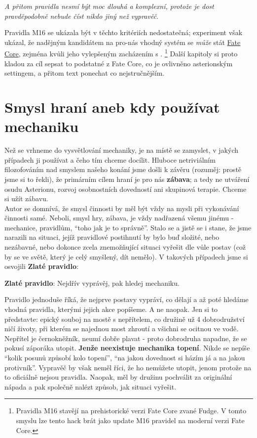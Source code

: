 \documentclass[../main.tex]{subfiles}
\begin{document}
\textit{A přitom pravidla nesmí být moc dlouhá a komplexní, protože je dost pravděpodobně nebude číst nikdo jiný než vypravěč.}

Pravidla M16 se ukázala být v těchto kritériích nedostatečná; experiment však ukázal, že nadějným kandidátem na pro-nás vhodný systém se \textit{může} stát \href{https://fate.nepocitacovehry.cz/?do=StahniFC}{Fate Core}, zejména kvůli jeho vylepšeným zacházením s . \footnote{Pravidla M16 stavějí na prehistorické verzi Fate Core zvané Fudge. V tomto smyslu lze tento hack brát jako update M16 pravidel na moderní verzi Fate Core.} Další kapitoly si proto kladou za cíl sepsat to podstatné z Fate Core, co je ovlivněno asterionským settingem, a přitom text ponechat co nejstručnějším. 

\section{Smysl hraní aneb kdy používat mechaniku}
\label{sec:proc}

Než se vrhneme do vysvětlování mechaniky, je na místě se zamyslet, v jakých případech ji používat a čeho tím chceme docílit. Hluboce netriviálním filozofováním nad smyslem našeho konání jsme došli k závěru (rozuměj: prostě jsme si to řekli), že primárním cílem hraní je pro nás \textbf{zábava}; a tedy ne utváření osudu Asterionu, rozvoj osobnostních dovedností ani skupinová terapie. Chceme si užít zábavu.\\

Autor se domnívá, že smysl činnosti by měl být vždy na mysli při vykonávání činnosti samé. Neboli, smysl hry, zábava, je vždy nadřazená všemu jinému - mechanice, pravidlům, ``toho jak je to správně''. Stalo se a jistě se i stane, že jsme narazili na situaci, jejíž pravidlové postihnutí by bylo buď složité, nebo nezábavné, nebo dokonce zcela znemožňující situaci vyřešit dle vůle postav (což by se ve světě, který je celý smyšlený, dít nemělo). V takových případech jsme si osvojili \textbf{Zlaté pravidlo}:

\begin{tcolorbox}
  \centering
  \textbf{Zlaté pravidlo}: Nejdřív vyprávěj, pak hledej mechaniku.
\end{tcolorbox}

Pravidlo jednoduše říká, že nejprve postavy vypráví, co dělají a až poté hledáme vhodná pravidla, kterými jejich akce popíšeme. A ne naopak. Jen si to představte: epický souboj na mostě s nepřítelem, co družině už 4 dobrodružství ničí životy, při kterém se najednou most zhroutí a všichni se ocitnou ve vodě. Nepřítel je černokněžník, neumí dobře plavat - proto dobrodruha napadne, že se pokusí záporáka utopit. \textbf{Jenže neexistuje mechanika topení}. Nikde se nepíše ``kolik posunů způsobí kolo topení'', ``na jakou dovednost si házím já a na jakou protivník''. Vypravěč by však neměl říci, že ho nemůžete utopit, jenom protože na to oficiálně nejsou pravidla. Naopak, měl by družinu pochválit za originální nápada a pak společně nalézt způsob, jak situaci vyřešit.\\
\end{document}
